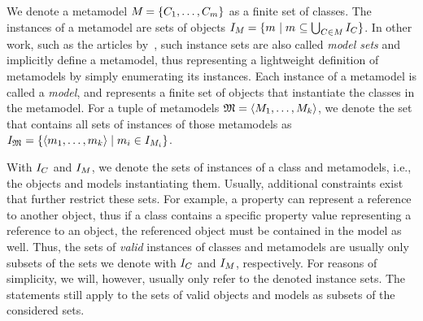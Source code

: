 We denote a metamodel $\metamodel{M}{} = \setted{\class{C}{1}, \dots, \class{C}{m}}$ as a finite set of classes.
The instances of a metamodel are sets of objects $\metamodelinstanceset{M}{} = \setted{\model{m}{} \mid \model{m}{} \subseteq \bigcup_{\class{C}{} \in \metamodel{M}{}} \instances{\class{C}{}}}$.
In other work, such as the articles by~\textcite{stevens2020BidirectionalTransformationLarge-SoSym}, such instance sets are also called \emph{model sets} and implicitly define a metamodel, thus representing a lightweight definition of metamodels by simply enumerating its instances.
Each instance of a metamodel is called a \emph{model}, and represents a finite set of objects that instantiate the classes in the metamodel.
For a tuple of metamodels $\metamodeltuple{M} = \tupled{\metamodel{M}{1}, \dots, \metamodel{M}{k}}$, we denote the set that contains all sets of instances of those metamodels as $\metamodeltupleinstanceset{M} = \setted{ \tupled{\model{m}{1}, \dots, \model{m}{k}} \mid \model{m}{i} \in \metamodelinstanceset{M}{i}}$.

With $\instances{\class{C}{}}$ and $\metamodelinstanceset{M}{}$, we denote the sets of instances of a class and metamodels, i.e., the objects and models instantiating them.
Usually, additional constraints exist that further restrict these sets.
For example, a property can represent a reference to another object, thus if a class contains a specific property value representing a reference to an object, the referenced object must be contained in the model as well.
Thus, the sets of \emph{valid} instances of classes and metamodels are usually only subsets of the sets we denote with $\instances{\class{C}{}}$ and $\metamodelinstanceset{M}{}$, respectively.
For reasons of simplicity, we will, however, usually only refer to the denoted instance sets.
The statements still apply to the sets of valid objects and models as subsets of the considered sets.



